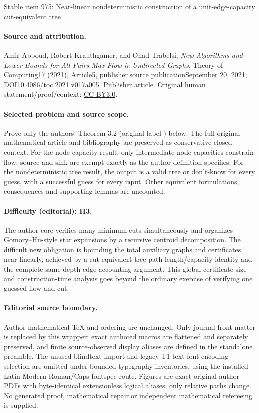 \documentclass[11pt]{article}
\numberwithin{equation}{section}
\theoremstyle{definition}
\theoremstyle{plain}
\theoremstyle{plain}
\begin{document}
\begin{center}{\Large Stable item 975: Near-linear nondeterministic construction of a unit-edge-capacity cut-equivalent tree}\end{center}
\paragraph{Source and attribution.}
Amir Abboud, Robert Krauthgamer, and Ohad Trabelsi, \emph{New Algorithms and Lower Bounds for All-Pairs Max-Flow in Undirected Graphs}. Theory of Computing17 (2021), Article5, publisher source publicationSeptember 20, 2021; DOI10.4086/toc.2021.v017a005. \href{https://theoryofcomputing.org/articles/v017a005/}{Publisher article}. Original human statement/proof/context: \href{https://creativecommons.org/licenses/by/3.0/}{CC BY3.0}.
\paragraph{Selected problem and source scope.}
Prove only the authors' Theorem 3.2 (original label ) below. The full original mathematical article and bibliography are preserved as conservative closed context. For the node-capacity result, only intermediate-node capacities constrain flow; source and sink are exempt exactly as the author definition specifies. For the nondeterministic tree result, the output is a valid tree or don't-know for every guess, with a successful guess for every input. Other equivalent formulations, consequences and supporting lemmas are uncounted.
\paragraph{Difficulty (editorial): H3.}
The author core verifies many minimum cuts simultaneously and organizes Gomory–Hu-style star expansions by a recursive centroid decomposition. The difficult new obligation is bounding the total auxiliary graphs and certificates near-linearly, achieved by a cut-equivalent-tree path-length/capacity identity and the complete same-depth edge-accounting argument. This global certificate-size and construction-time analysis goes beyond the ordinary exercise of verifying one guessed flow and cut.
\paragraph{Editorial source boundary.}
Author mathematical TeX and ordering are unchanged. Only journal front matter is replaced by this wrapper; exact authored macros are flattened and separately preserved, and finite source-observed display aliases are defined in the standalone preamble. The unused blindtext import and legacy T1 text-font encoding selection are omitted under bounded typography inventories, using the installed Latin Modern Roman/Caps fontspec route. Figures are exact original author PDFs with byte-identical extensionless logical aliases; only relative paths change. No generated proof, mathematical repair or independent mathematical refereeing is supplied. 
\clearpage
\end{document}
